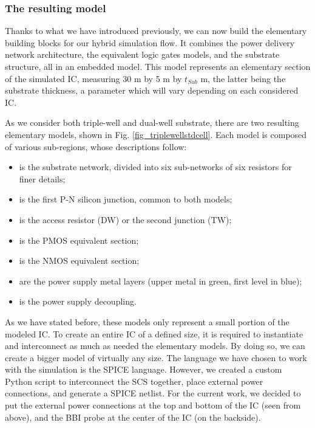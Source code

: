 	\subsubsection{The resulting model}
		Thanks to what we have introduced previously, we can now build the elementary building blocks for our hybrid simulation flow.
		It combines the power delivery network architecture, the equivalent logic gates models, and the substrate structure, all in an embedded model.
		This model represents an elementary section of the simulated IC, measuring 30 \textmu m by 5 \textmu m by $t_{Sub}$ \textmu m, the latter being the substrate thickness, a parameter which will vary depending on each considered IC.
		
		As we consider both triple-well and dual-well substrate, there are two resulting elementary models, shown in Fig. \ref{fig_triplewellstdcell}.
		Each model is composed of various sub-regions, whose descriptions follow:
		\begin{itemize}
			\item {} is the substrate network, divided into six sub-networks of six resistors for finer details;
			\item {} is the first P-N silicon junction, common to both models;
			\item {} is the access resistor (DW) or the second junction (TW);
			\item {} is the PMOS equivalent section;
			\item {} is the NMOS equivalent section;
			\item {} are the power supply metal layers (upper metal in green, first level in blue);
			\item {} is the power supply decoupling.
		\end{itemize}
		As we have stated before, these models only represent a small portion of the modeled IC.
		To create an entire IC of a defined size, it is required to instantiate and interconnect as much as needed the elementary models.
		By doing so, we can create a bigger model of virtually any size.
		The language we have chosen to work with the simulation is the SPICE language.
		However, we created a custom Python script to interconnect the SCS together, place external power connections, and generate a SPICE netlist.
		For the current work, we decided to put the external power connections at the top and bottom of the IC (seen from above), and the BBI probe at the center of the IC (on the backside).

